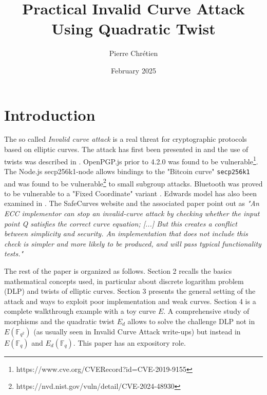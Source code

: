 \documentclass[10pt]{article}
\theoremstyle{definition}
\newcommand{\F}{\mathbb{F}}
\begin{document}

\author{Pierre Chrétien}
\title{Practical Invalid Curve Attack Using Quadratic Twist}
\date{February 2025}
\maketitle


\section{Introduction}

The so called \textsl{Invalid curve attack} is a real threat for cryptographic protocols based on elliptic curves.
The attack has first been presented in \cite{BMM00} and the use of twists was described in \cite{FLRV08}.
OpenPGP.js prior to 4.2.0 was found to be vulnerable\footnote{https://www.cve.org/CVERecord?id=CVE-2019-9155}. 
The Node.js secp256k1-node allows bindings to the  "Bitcoin curve" \verb|secp256k1| and was found to be vulnerable\footnote{https://nvd.nist.gov/vuln/detail/CVE-2024-48930} to small subgroup attacks.
Bluetooth was proved to be vulnerable to a "Fixed Coordinate" variant  \cite{cryptoeprint:2019/1043}.
Edwards model has also been examined in \cite{NT15}.
The SafeCurves website and the associated paper \cite{cryptoeprint:2024/1265} point out as 
\textsl{"An ECC implementor can stop an invalid-curve attack by checking whether the input point Q satisfies the correct curve equation; [...]
But this creates a conflict between simplicity and security. An implementation that does not include this check is simpler and more likely to be produced, and will pass typical functionality tests."}


The rest of the paper is organized as follows.
Section 2 recalls the basics mathematical concepts used, in particular about discrete logarithm problem (DLP) and twists of elliptic curves. 
Section 3 presents the general setting of the attack and ways to exploit poor implementation and weak curves.
Section 4 is a complete walkthrough example with a toy curve $E$.
A comprehensive study of morphisms and the quadratic twist $E_d$ allows to solve the challenge DLP not in $E(\F_{q^2})$ (as usually seen in Invalid Curve Attack write-ups) but instead in $E(\F_{q})$ and $E_d(\F_{q})$. 
This paper has an expository role.
\end{document}
